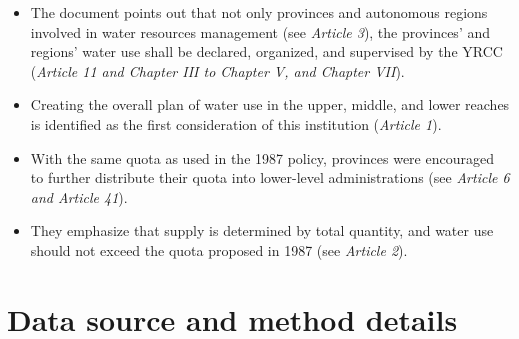 \documentclass[preprint, 12pt]{elsarticle}
\begin{document}
\begin{itemize}
\item The document points out that not only provinces and autonomous regions involved in water resources management (see \textit{Article 3}), the provinces’ and regions’ water use shall be declared, organized, and supervised by the YRCC (\textit{Article 11 and Chapter III to Chapter V, and Chapter VII}).
\item Creating the overall plan of water use in the upper, middle, and lower reaches is identified as the first consideration of this institution (\textit{Article 1}).
\item With the same quota as used in the 1987 policy, provinces were encouraged to further distribute their quota into lower-level administrations (see \textit{Article 6 and Article 41}).
\item They emphasize that supply is determined by total quantity, and water use should not exceed the quota proposed in 1987 (see \textit{Article 2}).
\end{itemize}




\newpage
\section{Data source and method details}\label{secS2}
\renewcommand{\thefigure}{B\arabic{figure}}
\renewcommand{\thetable}{B\arabic{table}}
\setcounter{figure}{0}
\setcounter{table}{0}
\end{document}
